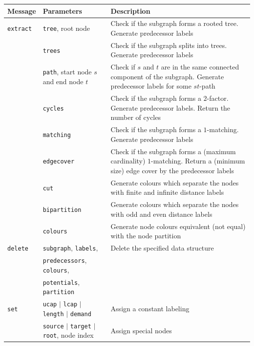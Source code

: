 \documentclass[a4paper,11pt,twoside]{book}
\begin{document}
\vfill
\begin{center}
\begin{tabular}{|p{2cm}|p{7cm}|p{15.5cm}|}
\hline
{\bf Message}       & {\bf Parameters} & {\bf Description} \\
\hline
\hline
\verb/extract/      & \verb/tree/, root node
                    & Check if the subgraph forms a rooted tree. Generate
                      predecessor labels \\
\hline
                    & \verb/trees/
                    & Check if the subgraph splits into trees. Generate
                      predecessor labels \\
\hline
                    & \verb/path/, start node $s$ and end node $t$
                    & Check if $s$ and $t$ are in the same connected
                      component of the subgraph. Generate predecessor labels
                      for some $st$-path \\
\hline
                    & \verb/cycles/
                    & Check if the subgraph forms a $2$-factor. Generate
                      predecessor labels. Return the number of cycles\\
\hline
                    & \verb/matching/
                    & Check if the subgraph forms a $1$-matching. Generate
                      predecessor labels\\
\hline
                    & \verb/edgecover/
                    & Check if the subgraph forms a (maximum cardinality)
                      $1$-matching. Return a (minimum size) edge cover by the
                      predecessor labels\\
\hline
                    & \verb/cut/
                    & Generate colours which separate the nodes with finite
                      and infinite distance labels \\
\hline
                    & \verb/bipartition/
                    & Generate colours which separate the nodes with odd and
                      even distance labels\\
\hline
                    & \verb/colours/
                    & Generate node colours equivalent (not equal) with the
                      node partition \\
\hline
\verb/delete/       & \verb/subgraph/, \verb/labels/,
                        & Delete the specified data structure \\
                    & \verb/predecessors/, \verb/colours/, & \\
                    & \verb/potentials/, \verb/partition/ & \\
\hline
\verb/set/          & \verb/ucap/ $|$ \verb/lcap/ $|$ \verb/length/ $|$ \verb/demand/
                    & Assign a constant labeling \\
\hline
                    & \verb/source/ $|$ \verb/target/ $|$ \verb/root/, node index
                    & Assign special nodes \\
\hline
\end{tabular}
\end{center}
\end{document}
